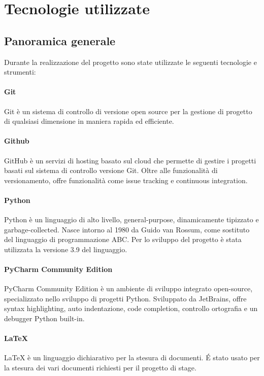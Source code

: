
\chapter{Tecnologie utilizzate}
\label{cap3}

\section{Panoramica generale}
Durante la realizzazione del progetto sono state utilizzate le seguenti tecnologie e strumenti:

\subsubsection{Git} 
Git è un sistema di controllo di versione open source per la gestione di progetto di qualsiasi dimensione in maniera rapida ed efficiente. 

\subsubsection{Github}
GitHub è un servizi di hosting basato sul cloud che permette di gestire i progetti basati sul sistema di controllo versione Git. Oltre alle funzionalità di versionamento, offre funzionalità come issue tracking e continuous integration. 


\subsubsection{Python}
Python è un linguaggio di alto livello, general-purpose, dinamicamente tipizzato e garbage-collected. Nasce intorno al 1980 da Guido van Rossum, come sostituto del linguaggio di programmazione ABC. Per lo sviluppo del progetto è stata utilizzata la versione 3.9 del linguaggio.


\subsubsection{PyCharm Community Edition}
PyCharm Community Edition è un ambiente di sviluppo integrato open-source, specializzato nello sviluppo di progetti Python. Sviluppato da JetBrains, offre syntax highlighting, auto indentazione, code completion, controllo ortografia e un debugger Python built-in.

\subsubsection{\LaTeX}
\LaTeX{} è un linguaggio dichiarativo per la stesura di documenti. \'E stato usato per la
stesura dei vari documenti richiesti per il progetto di stage.


